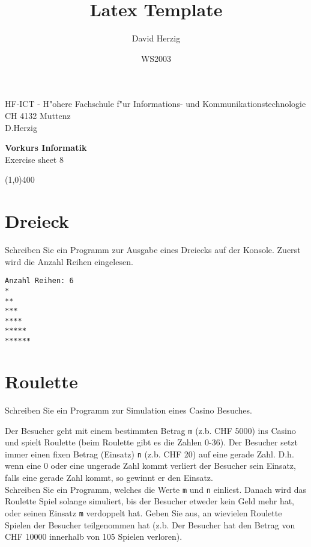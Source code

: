 \documentclass[a4paper,10pt]{article}
\title{Latex Template}
\author{David Herzig}
\date{WS2003}
\begin{document}
HF-ICT - H"ohere Fachschule f"ur Informations- und Kommunikationstechnologie\\
CH 4132 Muttenz\\
D.Herzig

\vspace{2mm}

\begin{center}
{\Large \bf Vorkurs Informatik}\\
Exercise sheet 8
\end{center}

\vspace{2mm}

\line(1,0){400}

\vspace{5mm}

\section{Dreieck}
Schreiben Sie ein Programm zur Ausgabe eines Dreiecks auf der Konsole. Zuerst wird die Anzahl Reihen eingelesen.

\vspace{5mm}

\verb|Anzahl Reihen: 6|\\
\verb|*|\\
\verb|**|\\
\verb|***|\\
\verb|****|\\
\verb|*****|\\
\verb|******|\\

\section{Roulette}
Schreiben Sie ein Programm zur Simulation eines Casino Besuches.

\vspace{3mm}

Der Besucher geht mit einem bestimmten Betrag \verb|m| (z.b. CHF 5000) ins Casino und spielt Roulette (beim Roulette gibt es die Zahlen 0-36).
Der Besucher setzt immer einen fixen Betrag (Einsatz) \verb|n| (z.b. CHF 20) auf eine gerade Zahl. D.h. wenn eine 0 oder eine ungerade Zahl
kommt verliert der Besucher sein Einsatz, falls eine gerade Zahl kommt, so gewinnt er den Einsatz.\\
Schreiben Sie ein Programm, welches die Werte \verb|m| und \verb|n| einliest. Danach wird das Roulette Spiel solange simuliert,
bis der Besucher etweder kein Geld mehr hat, oder seinen Einsatz \verb|m| verdoppelt hat. Geben Sie aus, an wievielen Roulette Spielen
der Besucher teilgenommen hat (z.b. Der Besucher hat den Betrag von CHF 10000 innerhalb von 105 Spielen verloren).
\end{document}
